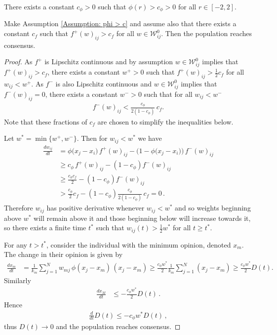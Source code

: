 \documentclass[10pt,a4paper]{amsart}
\begin{document}
\begin{assumption} \label{Assumption: phi > c}
    There exists a constant $c_\phi>0$ such that $\phi(r)>c_\phi>0$ for all $r\in[-2,2]$. 
\end{assumption}

\begin{proposition} \label{Prop: edge creating dynamics}
    Make Assumption \ref{Assumption: phi > c} and assume also that there exists a constant $c_f$ such that $f^+(w)_{ij} > c_f$ for all $w \in \mathcal{W}_{ij}^0$. Then the population reaches consensus. 
\end{proposition}

\begin{proof}
    As $f^+$ is Lipschitz continuous and by assumption $w\in \mathcal{W}_{ij}^0$ implies that $f^+(w)_{ij}>c_f$, there exists a constant $w^+>0$ such that $f^+(w)_{ij}>\frac{1}{2}c_f$ for all $w_{ij}<w^+$. 
    As $f^-$ is also Lipschitz continuous and $w\in \mathcal{W}_{ij}^0$ implies that $f^-(w)_{ij}=0$, there exists a constant $w^->0$ such that for all $w_{ij}<w^-$
    \begin{align*}
        f^-(w)_{ij} < \frac{c_\phi}{2(1 - c_\phi)} \, c_f.
    \end{align*} 
    Note that these fractions of $c_f$ are chosen to simplify the inequalities below. 
    
    Let $w^* = \min\{w^+,w^-\}$. Then for $w_{ij} < w^*$ we have 
    \begin{align*}
        \frac{dw_{ij}}{dt}
        &= \phi\big(x_j - x_i\big)\, f^+(w)_{ij} - \Big(1 - \phi\big(x_j - x_i\big)\Big)\, f^-(w)_{ij} \\
        &\geq c_\phi\, f^+(w)_{ij} - (1-c_\phi) f^-(w)_{ij} \\
        &\geq \frac{c_\phi c_f}{2} - (1-c_\phi) f^-(w)_{ij} \\
        &> \frac{c_\phi}{2} c_f - (1-c_\phi) \frac{c_\phi}{2(1 - c_\phi)} \, c_f 
        = 0 \,.
    \end{align*}
    Therefore $w_{ij}$ has positive derivative whenever $w_{ij}<w^*$ and so weights beginning above $w^*$ will remain above it and those beginning below will increase towards it, so there exists a finite time $t^*$ such that $w_{ij}(t)>\frac{1}{2}w^*$ for all $t\geq t^*$. 

    For any $t>t^*$, consider the individual with the minimum opinion, denoted $x_m$. The change in their opinion is given by
    \begin{align*}
        \frac{dx_m}{dt} 
        &= \frac{1}{k_m} \sum_{j=1}^N w_{mj}\,\phi(x_j - x_m)\,(x_j - x_m) 
        \geq \frac{c_\phi w^*}{2}\frac{1}{k_m} \sum_{j=1}^N (x_j - x_m) 
        \geq \frac{c_\phi w^*}{2} D(t).
    \end{align*}
    Similarly 
    \begin{align*}
        \frac{dx_M}{dt} 
        &\leq -\frac{c_\phi w^*}{2} D(t) \,.
    \end{align*}
    Hence 
    \begin{align*}
        \frac{d}{dt}D(t) \leq -c_\phi w^* D(t) \,,
    \end{align*}
    thus $D(t)\rightarrow0$ and the population reaches consensus. 
\end{proof}
\end{document}
